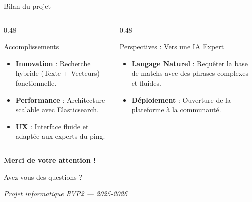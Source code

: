 \documentclass[aspectratio=169, 11pt]{beamer}
\begin{document}
\begin{frame}{Bilan du projet}
    \begin{columns}[T,onlytextwidth]
        \begin{column}{0.48\textwidth}
            \begin{block}{Accomplissements}
                \begin{itemize}\small
                    \item \textbf{Innovation} : Recherche hybride (Texte + Vecteurs) fonctionnelle.
                    \item \textbf{Performance} : Architecture scalable avec Elasticsearch.
                    \item \textbf{UX} : Interface fluide et adaptée aux experts du ping.
                \end{itemize}
            \end{block}
        \end{column}
        \begin{column}{0.48\textwidth}
            \begin{block}{Perspectives : Vers une IA Expert}
                \begin{itemize}\small
                    \item \textbf{Langage Naturel} : Requêter la base de matchs avec des phrases complexes et fluides.

                    \item \textbf{Déploiement} : Ouverture de la plateforme à la communauté.
                \end{itemize}
            \end{block}
        \end{column}
    \end{columns}
\end{frame}

\begin{frame}[plain]
    \centering
    \vspace{1.5cm}
    
    {\Huge \textbf{Merci de votre attention !}}
    
    \vspace{1cm}
    
    {\Large Avez-vous des questions ?}
    
    \vspace{2cm}
    
    \small
    \textit{Projet informatique RVP2 — 2025-2026}
\end{frame}
\end{document}
